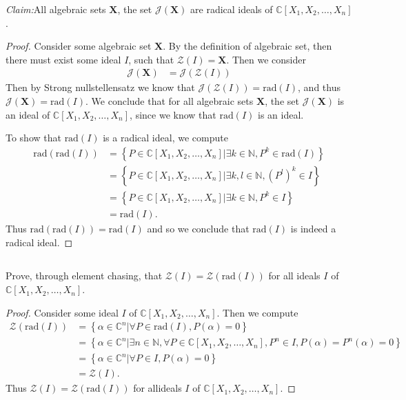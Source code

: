 \documentclass[10pt]{amsart}
\newcommand{\N}{\mathbb{N}}
\newcommand{\C}{\mathbb{C}}
\newcommand{\rad}[1]{\text{rad}\left(#1\right)}
\newenvironment{claim}[1]{\par\noindent\textit{Claim:}\space#1}{}
\begin{document}
\begin{claim}
  All algebraic sets $\mathbf{X}$, the set $\mathscr{J}(\mathbf{X})$ are
  radical ideals of $\C[X_1,X_2,\ldots,X_n]$.
\end{claim}
\begin{proof}
  Consider some algebraic set $\mathbf{X}$. By the definition of algebraic set,
  then there must exist some ideal $I$, such that $\mathscr{Z}(I)=\mathbf{X}$.
  Then we consider
  \begin{align*}
    \mathscr{J}(\mathbf{X})&=\mathscr{J}(\mathscr{Z}(I))
  \end{align*}
  Then by Strong nullstellensatz we know that
  $\mathscr{J}(\mathscr{Z}(I))=\rad{I}$, and thus
  $\mathscr{J}(\mathbf{X})=\rad{I}$. We conclude that for all algebraic sets
  $\mathbf{X}$, the set $\mathscr{J}(\mathbf{X})$ is an ideal of
  $\C[X_1,X_2,\ldots,X_n]$, since we know that $\rad{I}$ is an ideal.

  To show that $\rad{I}$ is a radical ideal, we compute
  \begin{align*}
    \rad{\rad{I}}&=\left\{P\in\C[X_1,X_2,\ldots,X_n]\vert\exists
      k\in\N,P^k\in\rad{I}\right\}\\
    &=\left\{P\in\C[X_1,X_2,\ldots,X_n]\vert\exists
      k,l\in\N,{\left(P^l\right)}^k\in I\right\}\\
    &=\left\{P\in\C[X_1,X_2,\ldots,X_n]\vert\exists
      k\in\N,P^k\in I\right\}\\
    &=\rad{I}.
  \end{align*}
  Thus $\rad{\rad{I}}=\rad{I}$ and so we conclude that $\rad{I}$ is indeed a
  radical ideal.
\end{proof}

\subsection{}%
\label{sub:4b}

Prove, through element chasing, that $\mathscr{Z}(I)=\mathscr{Z}(\rad{I})$ for
all ideals $I$ of $\C[X_1,X_2,\ldots,X_n]$.

\begin{proof}
  Consider some ideal $I$ of $\C[X_1,X_2,\ldots,X_n]$. Then we compute
  \begin{align*}
    \mathscr{Z}(\rad{I})&=\left\{\alpha\in\C^n\vert\forall
      P\in\rad{I},P(\alpha)=0\right\}\\
    &=\left\{\alpha\in\C^n\vert\exists n\in\N,\forall
      P\in\C[X_1,X_2,\ldots,X_n],P^n\in I, P(\alpha)=P^n(\alpha)=0\right\}\\
    &=\left\{\alpha\in\C^n\vert\forall P\in I,P(\alpha)=0\right\}\\
    &=\mathscr{Z}(I).
  \end{align*}
  Thus $\mathscr{Z}(I)=\mathscr{Z}(\rad{I})$ for allideals $I$ of
  $\C[X_1,X_2,\ldots,X_n]$.
\end{proof}
\end{document}
